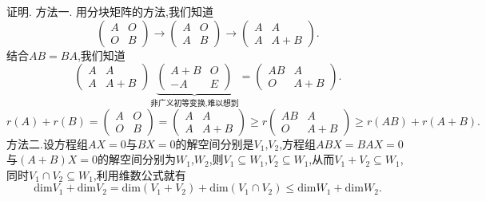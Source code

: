 \documentclass{article}
\begin{document}
{\heiti 证明. 方法一. }用分块矩阵的方法,我们知道
\begin{equation*}
    \left(
    \begin{array}{cc}
        A & O \\
        O & B
    \end{array}
    \right)
    \longrightarrow
    \left(
    \begin{array}{cc}
        A & O \\
        A & B
    \end{array}
    \right)
    \longrightarrow
    \left(
    \begin{array}{cc}
        A & A     \\
        A & A + B
    \end{array}
    \right).
\end{equation*}
结合$AB = BA$,我们知道
\begin{equation*}
    \left(
    \begin{array}{cc}
            A & A     \\
            A & A + B
        \end{array}
    \right)
    \underbrace{\left(              %
        \begin{array}{cc}
            A + B & O \\
            -A    & E
        \end{array}
        \right)}_{\text{非广义初等变换,难以想到}}
    =
    \left(
    \begin{array}{cc}
            AB & A     \\
            O  & A + B
        \end{array}
    \right).
\end{equation*}
\begin{equation*}
    r \left(A\right) + r \left(B\right)
    =
    \left(
    \begin{array}{cc}
        A & O \\
        O & B
    \end{array}
    \right)
    =
    \left(
    \begin{array}{cc}
        A & A     \\
        A & A + B
    \end{array}
    \right)
    \ge
    r \left(
    \begin{array}{cc}
        AB & A     \\
        O  & A + B
    \end{array}
    \right)
    \ge
    r \left(AB\right) + r \left(A + B\right).
\end{equation*}
{\heiti 方法二.}设方程组$AX = 0$与$BX = 0$的解空间分别是$V_1$,$V_2$,方程组$ABX = BAX = 0$与$\left(A + B\right)X = 0$的解空间分别为$W_1$,$W_2$,则$V_1\subseteq W_1$,$V_2\subseteq W_1$,从而$V_1 + V_2\subseteq W_1$,同时$V_1\cap V_2 \subseteq W_1$,利用维数公式就有
\begin{equation*}
    \mathrm{dim}V_1 + \mathrm{dim}V_2 = \mathrm{dim}\left(V_1 + V_2\right) + \mathrm{dim}\left(V_1 \cap V_2\right) \le \mathrm{dim}W_1 + \mathrm{dim}W_2.
\end{equation*}
\end{document}
